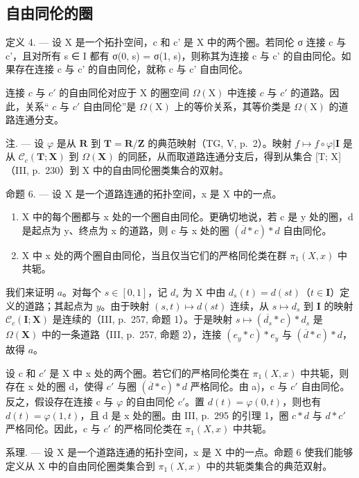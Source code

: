 \subsection{自由同伦的圈}

定义 4. --- 设 X 是一个拓扑空间，c 和 c' 是 X 中的两个圈。若同伦 σ 连接 c 与 c'，且对所有 s ∈ I 都有 σ(0, s) = σ(1, s)，则称其为连接 c 与 c' 的自由同伦。如果存在连接 c 与 c' 的自由同伦，就称 c 与 c' 自由同伦。

连接 \(c\) 与 \(c'\) 的自由同伦对应于 X 的圈空间 \(\Omega(\mathrm{X})\) 中连接 \(c\) 与 \(c'\) 的道路。因此，关系“ \(c\) 与 \(c'\) 自由同伦”是 \(\Omega(\mathrm{X})\) 上的等价关系，其等价类是 \(\Omega(\mathrm{X})\) 的道路连通分支。

注. --- 设 \(\varphi\) 是从 \(\mathbf{R}\) 到 \(\mathbf{T} = \mathbf{R}/\mathbf{Z}\) 的典范映射（TG, V, p.~2）。映射 \(f \mapsto f \circ \varphi|\mathbf{I}\) 是从 \(\mathcal{C}_c(\mathbf{T};\mathbf{X})\) 到 \(\Omega(\mathbf{X})\) 的同胚，从而取道路连通分支后，得到从集合 {[}T; X{]}（III, p.~230）到 X 中的自由同伦圈类集合的双射。

命题 6. --- 设 X 是一个道路连通的拓扑空间，x 是 X 中的一点。

\begin{enumerate}
\def\labelenumi{\alph{enumi})}
\item
  X 中的每个圈都与 x 处的一个圈自由同伦。更确切地说，若 c 是 y 处的圈，d 是起点为 y、终点为 x 的道路，则 c 与 x 处的圈 \((\overline{d} * c) * d\) 自由同伦。
\item
  X 中 x 处的两个圈自由同伦，当且仅当它们的严格同伦类在群 \(\pi_{1}(X,x)\) 中共轭。
\end{enumerate}

我们来证明 \(a\)。对每个 \(s \in [0,1]\)，记 \(d_s\) 为 X 中由 \(d_s(t) = d(st)\)（\(t \in \mathbf{I}\)）定义的道路；其起点为 \(y\)。由于映射 \((s,t) \mapsto d(st)\) 连续，从 \(s \mapsto d_s\) 到 \(\mathbf{I}\) 的映射 \(\mathcal{C}_c(\mathbf{I};\mathbf{X})\) 是连续的（III, p.~257, 命题 1）。于是映射 \(s \mapsto (\overline{d_s} * c) * d_s\) 是 \(\Omega(\mathbf{X})\) 中的一条道路（III, p.~257, 命题 2），连接 \((e_y * c) * e_y\) 与 \((\overline{d} * c) * d\)，故得 \(a\)。

设 c 和 \(c'\) 是 X 中 x 处的两个圈。若它们的严格同伦类在 \(\pi_{1}(X,x)\) 中共轭，则存在 x 处的圈 d，使得 \(c'\) 与圈 \((\overline{d} * c) * d\) 严格同伦。由 a)，c 与 \(c'\) 自由同伦。反之，假设存在连接 c 与 \(\varphi\) 的自由同伦 \(c'\)。置 \(d(t) = \varphi(0,t)\)，则也有 \(d(t) = \varphi(1,t)\)，且 d 是 x 处的圈。由 III, p.~295 的引理 1，圈 \(c * d\) 与 \(d * c'\) 严格同伦。因此，c 与 \(c'\) 的严格同伦类在 \(\pi_{1}(X,x)\) 中共轭。

系理. --- 设 X 是一个道路连通的拓扑空间，x 是 X 中的一点。命题 6 使我们能够定义从 X 中的自由同伦圈类集合到 \(\pi_{1}(X,x)\) 中的共轭类集合的典范双射。

